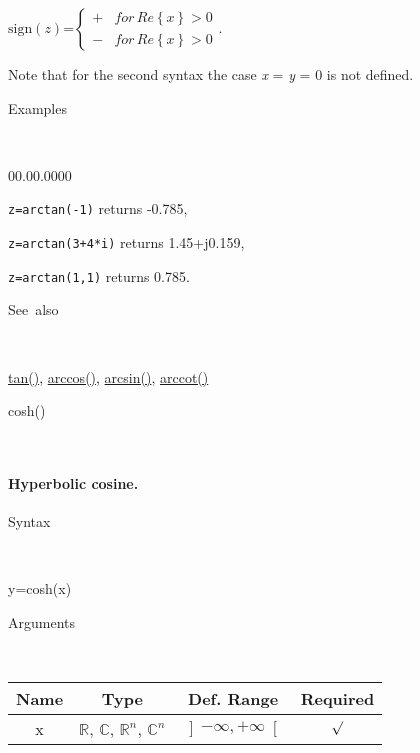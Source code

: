 \medskip{}
$\textrm{sign}(z)$=$\left\{ \begin{array}{cc}
+ & for\, Re\left\{ x\right\} >0\\
- & for\, Re\left\{ x\right\} >0\end{array}\right.$.
\medskip{}

Note that for the second syntax the case \textit{x} = \textit{y}
= 0 is not defined.

\begin{description}
\item [Examples]~
\end{description}
\begin{lyxlist}{00.00.0000}
\item [\texttt{z=arctan(-1)}]returns -0.785,
\item [\texttt{z=arctan(3+4{*}i)}]returns 1.45+j0.159,
\item [\texttt{z=arctan(1,1)}]returns 0.785.
\end{lyxlist}
\begin{description}
\item [See~also]~
\end{description}
\textcolor{blue}{\hyperlink{tan}{tan()}}\textcolor{black}{,} \textcolor{blue}{\hyperlink{arccos}{arccos()}}\textcolor{black}{,}
\textcolor{blue}{\hyperlink{arcsin}{arcsin()}}\textcolor{black}{,}
\textcolor{blue}{\hyperlink{arccot}{arccot()}}


\newpage
{}

\begin{description}
\item [\hypertarget{cosh}{}{\Large cosh()}]~{\Large \par}
\end{description}

\paragraph{\label{par:Hyperbolic-cosine}Hyperbolic cosine.}

\begin{description}
\item [Syntax]~
\end{description}
y=cosh(x)

\begin{description}
\item [Arguments]~
\end{description}
\begin{tabular}{|c|c|c|c|}
\hline 
Name&
Type&
Def. Range&
Required\tabularnewline
\hline
\hline 
x&
$\mathbb{R}$, $\mathbb{C}$, $\mathbb{R}^{n}$, $\mathbb{C}^{n}$&
$\left]-\infty,+\infty\right[$&
$\surd$\tabularnewline
\hline
\end{tabular}

